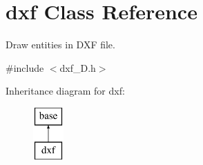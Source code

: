 \hypertarget{classdxf}{\section{dxf Class Reference}
\label{classdxf}
}


Draw entities in D\-X\-F file.  




{\ttfamily \#include $<$dxf\-\_\-D.\-h$>$}

Inheritance diagram for dxf\-:\begin{figure}[H]
\begin{center}
\leavevmode
\includegraphics[height=2.000000cm]{classdxf}
\end{center}
\end{figure}

